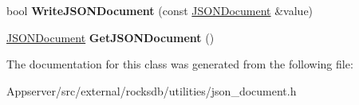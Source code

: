 \begin{DoxyCompactItemize}
\item 
bool {\bfseries Write\+J\+S\+O\+N\+Document} (const \hyperlink{classrocksdb_1_1JSONDocument}{J\+S\+O\+N\+Document} \&value)\hypertarget{classrocksdb_1_1JSONDocumentBuilder_a41e74919ea2157aeb387bbeb8e685584}{}\label{classrocksdb_1_1JSONDocumentBuilder_a41e74919ea2157aeb387bbeb8e685584}

\item 
\hyperlink{classrocksdb_1_1JSONDocument}{J\+S\+O\+N\+Document} {\bfseries Get\+J\+S\+O\+N\+Document} ()\hypertarget{classrocksdb_1_1JSONDocumentBuilder_ab3c16986e0eea459995c0d6aa96911b3}{}\label{classrocksdb_1_1JSONDocumentBuilder_ab3c16986e0eea459995c0d6aa96911b3}

\end{DoxyCompactItemize}


The documentation for this class was generated from the following file\+:\begin{DoxyCompactItemize}
\item 
Appserver/src/external/rocksdb/utilities/json\+\_\+document.\+h\end{DoxyCompactItemize}

